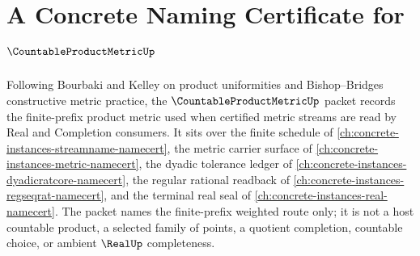 \chapter{A Concrete Naming Certificate for $\CountableProductMetricUp$}
\label{ch:concrete-instances-countable-product-metric-namecert}

Following Bourbaki and Kelley on product uniformities and Bishop--Bridges constructive metric practice, the $\CountableProductMetricUp$ packet records the finite-prefix product metric used when certified metric streams are read by Real and Completion consumers. It sits over the finite schedule of \autoref{ch:concrete-instances-streamname-namecert}, the metric carrier surface of \autoref{ch:concrete-instances-metric-namecert}, the dyadic tolerance ledger of \autoref{ch:concrete-instances-dyadicratcore-namecert}, the regular rational readback of \autoref{ch:concrete-instances-regseqrat-namecert}, and the terminal real seal of \autoref{ch:concrete-instances-real-namecert}. The packet names the finite-prefix weighted route only; it is not a host countable product, a selected family of points, a quotient completion, countable choice, or ambient $\RealUp$ completeness.


